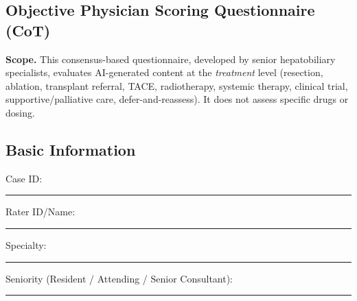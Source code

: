 \documentclass{article}
\begin{document}
\begin{appendices}
\clearpage



 
\setcounter{page}{1} 
\section{Objective Physician Scoring Questionnaire (CoT)}
\label{sec:treat_eval}

\noindent \textbf{Scope.} This consensus-based questionnaire, developed by senior hepatobiliary specialists, evaluates AI-generated content at the \emph{treatment} level (resection, ablation, transplant referral, TACE, radiotherapy, systemic therapy, clinical trial, supportive/palliative care, defer-and-reassess). It does not assess specific drugs or dosing.

\subsection{Basic Information}
\noindent Case ID:\ \rule{2.8cm}{0.4pt}\quad
Rater ID/Name:\ \rule{3.6cm}{0.4pt}\quad
Specialty:\ \rule{2.8cm}{0.4pt}\quad
Seniority (Resident / Attending / Senior Consultant):\ \rule{3.2cm}{0.4pt}


\end{appendices}
\end{document}
